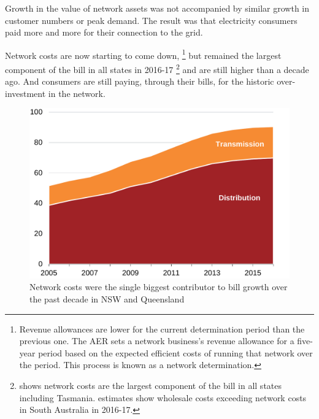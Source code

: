\documentclass[FrontPage]{grattan}
\begin{document}
Growth in the value of network assets was not accompanied by similar growth in customer numbers or peak demand. The result was that electricity consumers paid more and more for their connection to the grid.

Network costs are now starting to come down,%
\footnote{Revenue allowances are lower for the current determination period than the previous one. The AER sets a network business's revenue allowance for a five-year period based on the expected efficient costs of running that network over the period. This process is known as a network determination.} 
but remained the largest component of the bill in all states in 2016-17%
\footnote{\textcite{AEMC2017PriceTrends} shows network costs are the largest component of the bill in all states including Tasmania. \textcite{ACCC2017ElectricityInterimReport} estimates show wholesale costs exceeding network costs in South Australia in 2016-17.}
and are still higher than a decade ago. And consumers are still paying, through their bills, for the historic over-investment in the network.

\begin{figure}
\caption{Network costs were the single biggest contributor to bill growth over the past decade in NSW and Queensland}\label{fig:network-costs-biggest-contributor-to-bill-growth}
\includegraphics[page=4]{atlas/Charts.pdf}
\end{figure}
\end{document}
